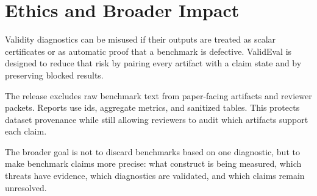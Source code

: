 \section{Ethics and Broader Impact}

Validity diagnostics can be misused if their outputs are treated as scalar certificates or as
automatic proof that a benchmark is defective. ValidEval is designed to reduce that risk by pairing
every artifact with a claim state and by preserving blocked results.

The release excludes raw benchmark text from paper-facing artifacts and reviewer packets. Reports use
ids, aggregate metrics, and sanitized tables. This protects dataset provenance while still allowing
reviewers to audit which artifacts support each claim.

The broader goal is not to discard benchmarks based on one diagnostic, but to make benchmark claims
more precise: what construct is being measured, which threats have evidence, which diagnostics are
validated, and which claims remain unresolved.
